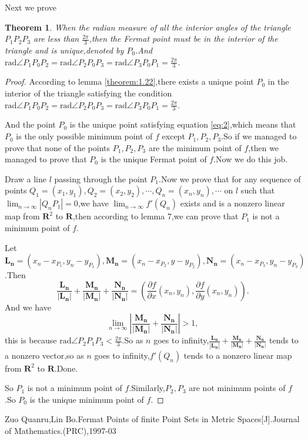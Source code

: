 \documentclass{amsart}
\theoremstyle{plain}
\newtheorem{theorem}{Theorem}
\theoremstyle{definition}
\begin{document}
Next we prove
\begin{theorem}\label{theorem:10}
When the radian  measure of all the interior angles of the triangle
$P_1P_2P_3$ are less than $\frac{2\pi}{3}$,then the Fermat point  must
be  in the interior of the triangle and is unique,denoted by $P_0$.And
$\mbox{rad}\angle P_1P_{0}P_2=\mbox{rad}\angle P_2P_{0}P_3=\mbox{rad}\angle P_3P_{0}P_1=\frac{2\pi}{3}$.
\end{theorem}
\begin{proof}
According to lemma \eqref{theorem:1.22},there exists a unique point
$P_{0}$ in the interior of the triangle  satisfying the condition
$\mbox{rad}\angle P_1P_{0}P_2=\mbox{rad}\angle P_2P_{0}P_3=\mbox{rad}\angle
P_3P_{0}P_1=\frac{2\pi}{3}$.

And the  point $P_0$ is the unique point satisfying equation
\eqref{eq:2},which means that $P_0$ is the only possible minimum point of $f$ except
$P_1,P_2,P_3$.So if we managed to prove that  none of the points $P_1,P_2,P_3$ are
the minimum point of $f$,then we managed to prove that $P_0$ is the unique
Fermat point of $f$.Now we do this job.

Draw a line $l$ passing through the point $P_1$.Now we prove that for any sequence of 
points $Q_1=(x_1,y_1),Q_2=(x_2,y_2),\cdots,Q_n=(x_n,y_n),\cdots$ on
$l$ such that $\lim_{n\to\infty}|Q_nP_1|=0$,we have
$\lim_{n\to\infty}f'(Q_n)$ exists and is a nonzero linear map from
$\mathbf{R}^2$ to $\mathbf{R}$,then according to lemma 7,we can prove
that $P_1$ is not
a minimum point of $f$.

Let
$\mathbf{L_{n}}=(x_{n}-x_{P_{1}},y_{n}-y_{P_{1}}),\mathbf{M_{n}}=(x_{n}-x_{P_{2}},y-y_{P_{2}}),\mathbf{N_{n}}=(x_{n}-x_{P_{3}},y_{n}-y_{P_{3}})$.Then
$$
\frac{\mathbf{L_{n}}}{\mathbf{|L_{n}|}}+\frac{\mathbf{M_{n}}}{|\mathbf{M_{n}}|}+\frac{\mathbf{N_{n}}}{\mathbf{|N_{n}|}}=(\frac{\partial f}{\partial x}(x_n,y_n),\frac{\partial f}{\partial y}(x_n,y_n)).
$$
And we have
$$
\lim_{n\to\infty}\left|\frac{\mathbf{M_{n}}}{|\mathbf{M_{n}}|}+\frac{\mathbf{N_{n}}}{|\mathbf{N_{n}}|}\right|>1,
$$
this is because $\mbox{rad}\angle P_2P_1P_3<\frac{2\pi}{3}$.So as $n$
goes to
infinity,$\frac{\mathbf{L_{n}}}{\mathbf{|L_{n}|}}+\frac{\mathbf{M_{n}}}{|\mathbf{M_{n}}|}+\frac{\mathbf{N_{n}}}{\mathbf{|N_{n}|}}$
tends to a nonzero vector,so as $n$ goes to infinity,$f'(Q_n)$ tends
to a nonzero linear map from $\mathbf{R}^2$ to $\mathbf{R}$.Done.

So $P_1$ is not a minimum point of $f$.Similarly,$P_2,P_3$ are not
minimum points of $f$.So $P_0$ is the unique minimum point of $f$.
\end{proof}
\begin{thebibliography}{1}
Zuo Quanru,Lin Bo.Fermat Points of finite Point Sets in
  Metric Spaces[J].Journal of Mathematics.(PRC),1997-03
\end{thebibliography}
\end{document}
